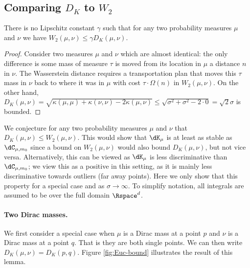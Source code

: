 \documentclass[11pt]{myclass}
\begin{document}
\subsection{Comparing $D_K$ to $W_2$}
\begin{lemma}
There is no Lipschitz constant $\gamma$ such that for any two probability measures $\mu$ and $\nu$ we have $W_2(\mu,\nu) \leq \gamma D_K(\mu,\nu)$.  
\end{lemma}
\begin{proof}
Consider two measures $\mu$ and $\nu$ which are almost identical: the only difference is some mass of measure $\tau$ is moved from its location in $\mu$ a distance $n$ in $\nu$. 
The Wasserstein distance requires a transportation plan that moves this $\tau$ mass in $\nu$ back to where it was in $\mu$ with cost $\tau \cdot \Omega(n)$ in $W_2(\mu,\nu)$.  
On the other hand,  $D_K(\mu,\nu) = \sqrt{\kappa(\mu,\mu) + \kappa(\nu,\nu) - 2 \kappa(\mu,\nu)} \leq \sqrt{\sigma^2 + \sigma^2 - 2\cdot0} = \sqrt{2} \sigma$ is bounded.  
\end{proof}

We conjecture for any two probability measures $\mu$ and $\nu$ that $D_K(\mu,\nu) \leq W_2(\mu,\nu)$.  This would show that $\dK_\mu$ is at least as stable as $\dC_{\mu,m_0}$ since a bound on $W_2(\mu,\nu)$ would also bound $D_K(\mu,\nu)$, but not vice versa.  
Alternatively, this can be viewed as $\dK_\mu$ is less discriminative than $\dC_{\mu,m_0}$; we view this as a positive in this setting, as it is mainly less discriminative towards outliers (far away points).  
Here we only show that this property for a special case and as $\sigma \to \infty$.  
To simplify notation, all integrals are assumed to be over the full domain $\Rspace^d$.  

\paragraph{Two Dirac masses.}
We first consider a special case when $\mu$ is a Dirac mass at a point $p$ and $\nu$ is a Dirac mass at a point $q$.  That is they are both single points.  We can then write $D_K(\mu,\nu) = D_K(p,q)$.  Figure \ref{fig:Euc-bound} illustrates the result of this lemma.  
\end{document}
